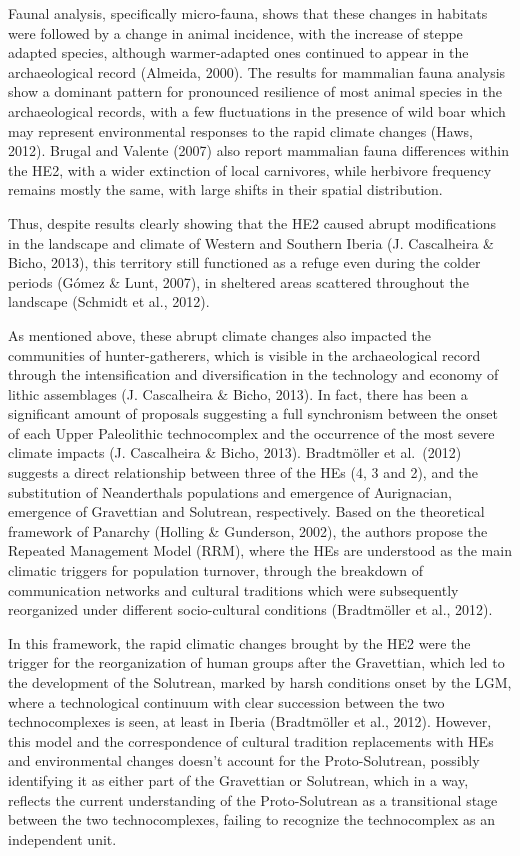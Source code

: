 \documentclass[12pt,twoside]{reedthesis}
\begin{document}
Faunal analysis, specifically micro-fauna, shows that these changes in habitats were followed by a change in animal incidence, with the increase of steppe adapted species, although warmer-adapted ones continued to appear in the archaeological record (Almeida, 2000). The results for mammalian fauna analysis show a dominant pattern for pronounced resilience of most animal species in the archaeological records, with a few fluctuations in the presence of wild boar which may represent environmental responses to the rapid climate changes (Haws, 2012). Brugal and Valente (2007) also report mammalian fauna differences within the HE2, with a wider extinction of local carnivores, while herbivore frequency remains mostly the same, with large shifts in their spatial distribution.

Thus, despite results clearly showing that the HE2 caused abrupt modifications in the landscape and climate of Western and Southern Iberia (J. Cascalheira \& Bicho, 2013), this territory still functioned as a refuge even during the colder periods (Gómez \& Lunt, 2007), in sheltered areas scattered throughout the landscape (Schmidt et al., 2012).

As mentioned above, these abrupt climate changes also impacted the communities of hunter-gatherers, which is visible in the archaeological record through the intensification and diversification in the technology and economy of lithic assemblages (J. Cascalheira \& Bicho, 2013). In fact, there has been a significant amount of proposals suggesting a full synchronism between the onset of each Upper Paleolithic technocomplex and the occurrence of the most severe climate impacts (J. Cascalheira \& Bicho, 2013). Bradtmöller et al.~(2012) suggests a direct relationship between three of the HEs (4, 3 and 2), and the substitution of Neanderthals populations and emergence of Aurignacian, emergence of Gravettian and Solutrean, respectively. Based on the theoretical framework of Panarchy (Holling \& Gunderson, 2002), the authors propose the Repeated Management Model (RRM), where the HEs are understood as the main climatic triggers for population turnover, through the breakdown of communication networks and cultural traditions which were subsequently reorganized under different socio-cultural conditions (Bradtmöller et al., 2012).

In this framework, the rapid climatic changes brought by the HE2 were the trigger for the reorganization of human groups after the Gravettian, which led to the development of the Solutrean, marked by harsh conditions onset by the LGM, where a technological continuum with clear succession between the two technocomplexes is seen, at least in Iberia (Bradtmöller et al., 2012). However, this model and the correspondence of cultural tradition replacements with HEs and environmental changes doesn't account for the Proto-Solutrean, possibly identifying it as either part of the Gravettian or Solutrean, which in a way, reflects the current understanding of the Proto-Solutrean as a transitional stage between the two technocomplexes, failing to recognize the technocomplex as an independent unit.
\end{document}
